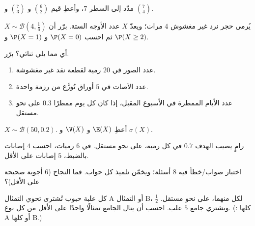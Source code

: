 \begin{exercise}[$\star$]\label{exo:g11:binom:1}
مدّد  إلى السطر $7$، وأعطِ قيم
$\binom62$ و $\binom{7}{3}$ و $\binom74$.
\end{exercise}

\begin{exercise}[$\star$]\label{exo:g11:binom:2}
يُرمى حجر نرد غير مغشوش $4$ مرات؛ ويعدّ $X$ عدد الأوجه الستة. برّر أن
$X \sim \mathcal B\left(4, \frac16\right)$ ثم احسب $\P(X = 0)$
و $\P(X = 1)$ و $\P(X \geq 2)$.
\end{exercise}

\begin{exercise}[$\star$]\label{exo:g11:binom:3}
أي مما يلي ثنائي؟ برّر.
\begin{enumerate}
  \item عدد الصور في $20$ رمية لقطعة نقد غير مغشوشة.
  \item عدد الآصات في $5$ أوراق تُوزَّع من رزمة واحدة.
  \item عدد الأيام الممطرة في الأسبوع المقبل، إذا كان كل يوم ممطرًا
         $0.3$ على نحو مستقل.
\end{enumerate}
\end{exercise}

\begin{exercise}[$\star$]\label{exo:g11:binom:4}
$X \sim \mathcal B(50, 0.2)$. أعطِ $\E(X)$ و $\V(X)$ و $\sigma(X)$.
\end{exercise}

\begin{exercise}[$\star\star$]\label{exo:g11:binom:5}
رامٍ يصيب الهدف  $0.7$ في كل رمية،
على نحو مستقل. في $6$ رميات، احسب  $4$ إصابات بالضبط،
 $5$ إصابات على الأقل.
\end{exercise}

\begin{exercise}[$\star\star$]\label{exo:g11:binom:6}
اختبار صواب/خطأ فيه $8$ أسئلة؛ ويخمّن تلميذ كل جواب.
فما  النجاح ($6$ أجوبة صحيحة على الأقل)؟
\end{exercise}

\begin{exercise}[$\star\star$]\label{exo:g11:binom:7}
كل علبة حبوب تُشترى تحوي التمثال A أو التمثال B، 
$\frac12$ لكل منهما، على نحو مستقل. ويشتري جامع $5$ علب.
احسب  أن ينال الجامع تمثالًا واحدًا على الأقل من
كل نوع. (: كلها A أو كلها B.)
\end{exercise}

